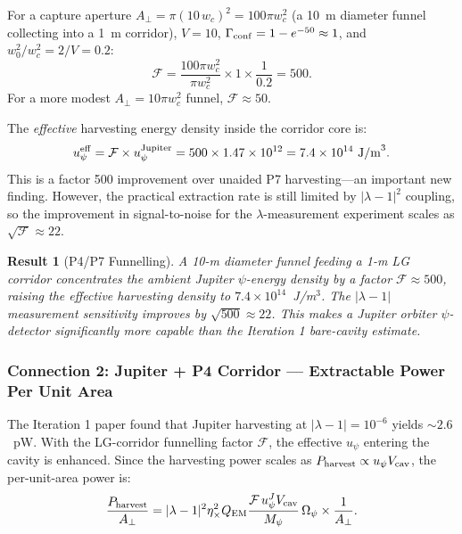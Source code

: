 \documentclass[aps,prd,twocolumn,superscriptaddress,nofootinbib]{revtex4-2}
\newcommand{\Opsi}{\Omega_\psi}
\newtheorem{result}{Result}
\begin{document}
For a capture aperture $A_\perp = \pi (10\,w_c)^2 = 100\pi w_c^2$ (a 10~m
diameter funnel collecting into a 1~m corridor), $V = 10$,
$\Gamma_{\rm conf} = 1 - e^{-50} \approx 1$, and $w_0^2/w_c^2 = 2/V = 0.2$:
\begin{equation}
\boxed{\mathcal{F} = \frac{100\pi w_c^2}{\pi w_c^2} \times 1 \times \frac{1}{0.2}
= 500.}
\end{equation}
For a more modest $A_\perp = 10\pi w_c^2$ funnel, $\mathcal{F} \approx 50$.

The \emph{effective} harvesting energy density inside the corridor core is:
\begin{equation}
u_\psi^{\rm eff} = \mathcal{F} \times u_\psi^{\rm Jupiter}
= 500 \times 1.47 \times 10^{12} = 7.4 \times 10^{14}~\text{J/m}^3.
\end{equation}
This is a factor 500 improvement over unaided P7 harvesting---an important
new finding.  However, the practical extraction rate is still limited by
$|\lambda-1|^2$ coupling, so the improvement in signal-to-noise for the
$\lambda$-measurement experiment scales as $\sqrt{\mathcal{F}} \approx 22$.

\begin{result}[P4/P7 Funnelling]
A 10-m diameter funnel feeding a 1-m LG corridor concentrates the ambient
Jupiter $\psi$-energy density by a factor $\mathcal{F} \approx 500$, raising
the effective harvesting density to $7.4 \times 10^{14}$~J/m$^3$.  The
$|\lambda-1|$ measurement sensitivity improves by $\sqrt{500} \approx 22$.
This makes a Jupiter orbiter $\psi$-detector significantly more capable than
the Iteration 1 bare-cavity estimate.
\end{result}

\subsubsection{Connection 2: Jupiter + P4 Corridor --- Extractable Power Per
Unit Area}

The Iteration 1 paper found that Jupiter harvesting at $|\lambda-1| = 10^{-6}$
yields $\sim 2.6$~pW.  With the LG-corridor funnelling factor $\mathcal{F}$,
the effective $u_\psi$ entering the cavity is enhanced.  Since the harvesting
power scales as $P_{\rm harvest} \propto u_\psi V_{\rm cav}$, the per-unit-area
power is:
\begin{equation}
\frac{P_{\rm harvest}}{A_\perp}
= |\lambda-1|^2 \eta_\times^2 Q_{\rm EM}
\frac{\mathcal{F}\,u_\psi^J V_{\rm cav}}{M_\psi}\,\Opsi
\times \frac{1}{A_\perp}.
\end{equation}
\end{document}
